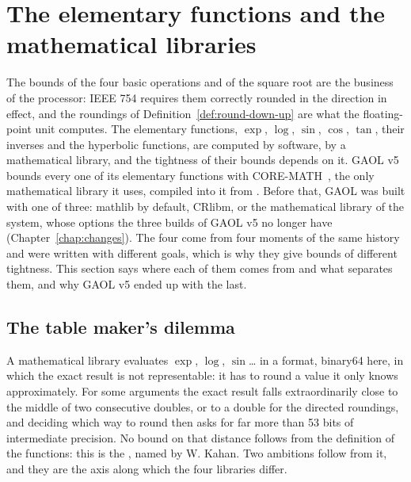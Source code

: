 \documentclass[12pt,a4paper,twoside,openright]{book}
\begin{document}
\section{The elementary functions and the mathematical libraries}
\label{sec:math-libraries}
%
%

The bounds of the four basic operations and of the square root are the
business of the processor: IEEE 754 requires them correctly rounded in the
direction in effect, and the roundings of Definition~\ref{def:round-down-up}
are what the floating-point unit computes. The elementary functions,
$\exp$, $\log$, $\sin$, $\cos$, $\tan$, their inverses and the hyperbolic
functions, are computed by software, by a mathematical library, and the
tightness of their bounds depends on it. GAOL v5 bounds every one of its
elementary functions with CORE-MATH~\cite{CoreMath:2022}, the only
mathematical library it uses, compiled into it from .
Before that, GAOL was built with one of three: mathlib by default, CRlibm,
or the mathematical library of the system, whose options the three builds of GAOL
v5 no longer have (Chapter~\ref{chap:changes}).\newinvfive{} The
four come from four moments of the same history and were written with
different goals, which is why they give bounds of different tightness. This
section says where each of them comes from and what separates them, and why
GAOL v5 ended up with the last.

\subsection{The table maker's dilemma}
%
%

A mathematical library evaluates $\exp$, $\log$, $\sin$\ldots{} in a
format, binary64 here, in which the exact result is not representable: it
has to round a value it only knows approximately. For some arguments the
exact result falls extraordinarily close to the middle of two consecutive
doubles, or to a double for the directed roundings, and deciding which way to round then asks for far more than 53
bits of intermediate precision. No bound on that distance follows from the
definition of the functions: this is the , named
by W. Kahan. Two ambitions follow from it, and they are the axis along
which the four libraries differ.
\end{document}
